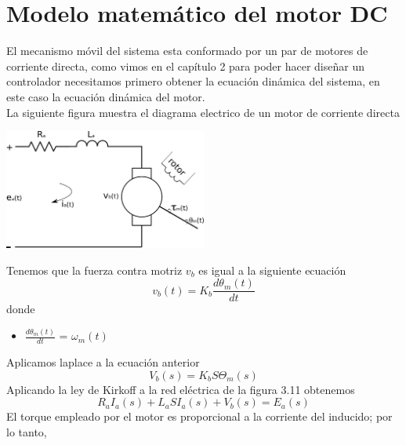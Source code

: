 \section{Modelo matemático del motor DC}
El mecanismo móvil del sistema esta conformado por un par de motores de corriente directa, como vimos
en el capítulo 2 para poder hacer diseñar un controlador necesitamos primero obtener la ecuación dinámica
del sistema, en este caso la ecuación dinámica del motor.\\
La siguiente figura muestra el diagrama electrico de un motor de corriente directa
\begin{center}
	\includegraphics[width=0.5\textwidth]{Contenido/Cuerpo/Capitulo3/Fig16.eps}
	\label{fig:ModeloMat:Fig1}
\end{center}
Tenemos que la fuerza contra motriz $v_b$ es igual a la siguiente ecuación
\begin{equation}
	v_b(t) =K_b \frac{d\theta_m(t)}{dt}
\end{equation}
donde 
\begin{itemize}
	\item $ \frac{d\theta_m(t)}{dt} $ = $ \omega_m(t) $
\end{itemize}
Aplicamos laplace a la ecuación anterior
\begin{equation}
	V_b(s) = K_bS\Theta_m(s)
\end{equation}
Aplicando la ley de Kirkoff a la red eléctrica de la figura 3.11 obtenemos
\begin{equation}
	R_aI_a(s) + L_aSI_a(s) + V_b(s) = E_a(s)
\end{equation}
El torque empleado por el motor es proporcional a la corriente del inducido; por lo tanto,
